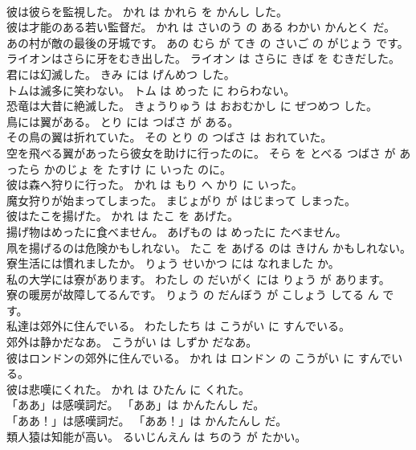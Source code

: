 \documentclass[8pt]{extreport}
\begin{document}
\begin{CJK}{UTF8}{min}
\\	彼は彼らを監視した。	かれ は かれら を かんし した。	
\\	彼は才能のある若い監督だ。	かれ は さいのう の ある わかい かんとく だ。	
\\	あの村が敵の最後の牙城です。	あの むら が てき の さいご の がじょう です。	
\\	ライオンはさらに牙をむき出した。	ライオン は さらに きば を むきだした。	
\\	君には幻滅した。	きみ には げんめつ した。	
\\	トムは滅多に笑わない。	トム は めった に わらわない。	
\\	恐竜は大昔に絶滅した。	きょうりゅう は おおむかし に ぜつめつ した。	
\\	鳥には翼がある。	とり には つばさ が ある。	
\\	その鳥の翼は折れていた。	その とり の つばさ は おれていた。	
\\	空を飛べる翼があったら彼女を助けに行ったのに。	そら を とべる つばさ が あったら かのじょ を たすけ に いった のに。	
\\	彼は森へ狩りに行った。	かれ は もり へ かり に いった。	
\\	魔女狩りが始まってしまった。	まじょがり が はじまって しまった。	
\\	彼はたこを揚げた。	かれ は たこ を あげた。	
\\	揚げ物はめったに食べません。	あげもの は めったに たべません。	
\\	凧を揚げるのは危険かもしれない。	たこ を あげる のは きけん かもしれない。	
\\	寮生活には慣れましたか。	りょう せいかつ には なれました か。	
\\	私の大学には寮があります。	わたし の だいがく には りょう が あります。	
\\	寮の暖房が故障してるんです。	りょう の だんぼう が こしょう してる ん です。	
\\	私達は郊外に住んでいる。	わたしたち は こうがい に すんでいる。	
\\	郊外は静かだなあ。	こうがい は しずか だなあ。	
\\	彼はロンドンの郊外に住んでいる。	かれ は ロンドン の こうがい に すんでいる。	
\\	彼は悲嘆にくれた。	かれ は ひたん に くれた。	
\\	「ああ」は感嘆詞だ。	「ああ」は かんたんし だ。	
\\	「ああ！」は感嘆詞だ。	「ああ！」は かんたんし だ。	
\\	類人猿は知能が高い。	るいじんえん は ちのう が たかい。	

\end{CJK}
\end{document}
